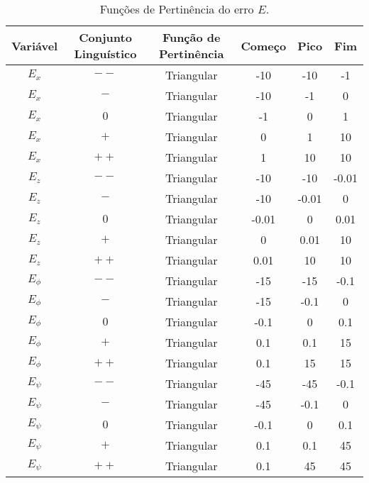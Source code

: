\begin{table}[h!]
\centering
\begin{tabular}{|c|c|c|c|c|c|}
    \hline
    Variável & Conjunto Linguístico & Função de Pertinência & Começo & Pico & Fim \\
    \hline
    $E_x$ & $--$ & Triangular & -10 & -10 & -1 \\
    $E_x$ & $-$  & Triangular & -10 & -1 & 0 \\
    $E_x$ & $0$  & Triangular & -1 & 0 & 1 \\
    $E_x$ & $+$  & Triangular & 0 & 1 & 10 \\
    $E_x$ & $++$ & Triangular & 1 & 10 & 10 \\
    \hline
    $E_{z}$ & $--$ & Triangular & -10 & -10 & -0.01 \\
    $E_{z}$ & $-$  & Triangular & -10 & -0.01 & 0 \\
    $E_{z}$ & $0$  & Triangular & -0.01 & 0 & 0.01 \\
    $E_{z}$ & $+$  & Triangular & 0 & 0.01 & 10 \\
    $E_{z}$ & $++$ & Triangular & 0.01 & 10 & 10 \\
    \hline
    $E_{\phi}$ & $--$ & Triangular & -15 & -15 & -0.1 \\
    $E_{\phi}$ & $-$  & Triangular & -15 & -0.1 & 0 \\
    $E_{\phi}$ & $0$  & Triangular & -0.1 & 0 & 0.1 \\
    $E_{\phi}$ & $+$  & Triangular & 0.1 & 0.1 & 15 \\
    $E_{\phi}$ & $++$ & Triangular & 0.1 & 15 & 15 \\
    \hline
    $E_{\psi}$ & $--$ & Triangular & -45 & -45 & -0.1 \\
    $E_{\psi}$ & $-$  & Triangular & -45 & -0.1 & 0 \\
    $E_{\psi}$ & $0$  & Triangular & -0.1 & 0 & 0.1 \\
    $E_{\psi}$ & $+$  & Triangular & 0.1 & 0.1 & 45 \\
    $E_{\psi}$ & $++$ & Triangular & 0.1 & 45 & 45 \\
    \hline
\end{tabular}

\caption{Funções de Pertinência do erro $E$.}
\label{tab:fuzzy_error}
\end{table}


